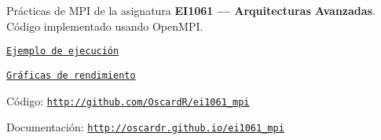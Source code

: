 Prácticas de M\-P\-I de la asignatura {\bfseries E\-I1061 — Arquitecturas Avanzadas}. Código implementado usando Open\-M\-P\-I.


\begin{DoxyItemize}
\item \href{usage.md}{\tt Ejemplo de ejecución}
\end{DoxyItemize}


\begin{DoxyItemize}
\item \href{performance.md}{\tt Gráficas de rendimiento}
\end{DoxyItemize}


\begin{DoxyItemize}
\item Código\-: \href{http://github.com/OscardR/ei1061_mpi}{\tt http\-://github.\-com/\-Oscard\-R/ei1061\-\_\-mpi}
\end{DoxyItemize}


\begin{DoxyItemize}
\item Documentación\-: \href{http://oscardr.github.io/ei1061_mpi}{\tt http\-://oscardr.\-github.\-io/ei1061\-\_\-mpi} 
\end{DoxyItemize}